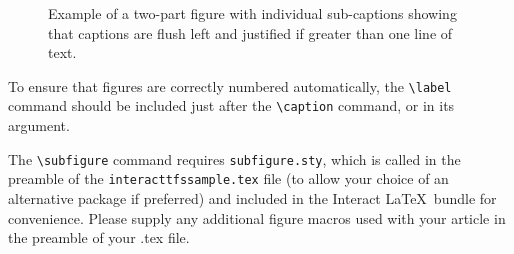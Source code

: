 \documentclass[]{interact}
\theoremstyle{plain}%
\theoremstyle{definition}
\theoremstyle{remark}
\begin{document}
\begin{figure}
\centering
{}\hspace{5pt}
\caption{Example of a two-part figure with individual sub-captions
 showing that captions are flush left and justified if greater
 than one line of text.} \label{sample-figure}
\end{figure}

To ensure that figures are correctly numbered automatically, the
\texttt{\textbackslash{}label} command should be included just after the
\texttt{\textbackslash{}caption} command, or in its argument.

The \texttt{\textbackslash{}subfigure} command requires
\texttt{subfigure.sty}, which is called in the preamble of the
\texttt{interacttfssample.tex} file (to allow your choice of an
alternative package if preferred) and included in the \textsf{Interact}
\LaTeX~bundle for convenience. Please supply any additional figure
macros used with your article in the preamble of your .tex file.
\end{document}
